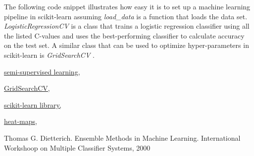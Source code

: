 \documentclass[fleqn,10pt]{SelfArx} %
\begin{document}
The following code snippet illustrates how easy it is to set up a machine
learning pipeline in scikit-learn assuming \textit{load\_data} is a function that
loads the data set. \textit{LogisticRegressionCV} is a class that trains a
logistic regression classifier using all the listed C-values and uses the
best-performing classifier to calculate accuracy on the test set. A similar
class that can be used to optimize hyper-parameters in scikit-learn is
\textit{GridSearchCV} \cite{gridsearchcv}.




\begin{thebibliography}{5}

  \href{http://scikit-learn.org/stable/modules/generated/sklearn.semi\_supervised.LabelSpreading.html}{semi-supervised learning,}

  \href{http://scikit-learn.org/stable/modules/generated/sklearn.model\_selection.GridSearchCV.html}{GridSearchCV,}

\href{http://scikit-learn.org/stable/}{scikit-learn library,}

\href{https://en.wikipedia.org/wiki/Heat_map}{heat-maps,}

  Thomas G. Dietterich.
  Ensemble Methods in Machine Learning.
  International Workshoop on Multiple Classifier Systems, 2000

\end{thebibliography}

\end{document}
